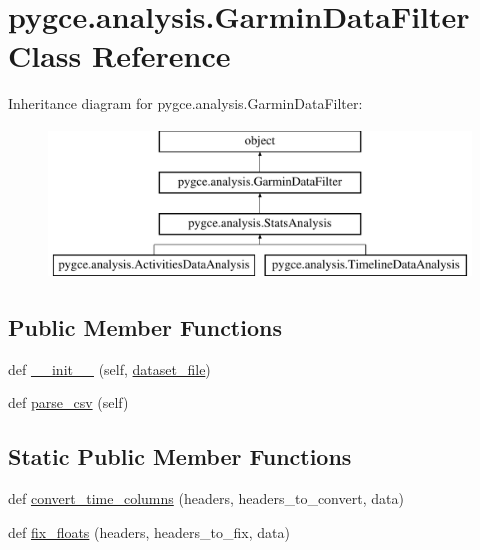 \hypertarget{classpygce_1_1analysis_1_1_garmin_data_filter}{}\section{pygce.\+analysis.\+Garmin\+Data\+Filter Class Reference}
\label{classpygce_1_1analysis_1_1_garmin_data_filter}
Inheritance diagram for pygce.\+analysis.\+Garmin\+Data\+Filter\+:\begin{figure}[H]
\begin{center}
\leavevmode
\includegraphics[height=4.000000cm]{classpygce_1_1analysis_1_1_garmin_data_filter}
\end{center}
\end{figure}
\subsection*{Public Member Functions}
\begin{DoxyCompactItemize}
\item 
def \hyperlink{classpygce_1_1analysis_1_1_garmin_data_filter_af82a21b2ce628ac96f3e5c0586bc096c}{\+\_\+\+\_\+init\+\_\+\+\_\+} (self, \hyperlink{classpygce_1_1analysis_1_1_garmin_data_filter_a1d609bdd447d36bafce41e43586540ef}{dataset\+\_\+file})
\item 
def \hyperlink{classpygce_1_1analysis_1_1_garmin_data_filter_a20693ff1b6595241436b350403aeb63c}{parse\+\_\+csv} (self)
\end{DoxyCompactItemize}
\subsection*{Static Public Member Functions}
\begin{DoxyCompactItemize}
\item 
def \hyperlink{classpygce_1_1analysis_1_1_garmin_data_filter_adc6e58e018ad152b58e1c47a470412ff}{convert\+\_\+time\+\_\+columns} (headers, headers\+\_\+to\+\_\+convert, data)
\item 
def \hyperlink{classpygce_1_1analysis_1_1_garmin_data_filter_a57cc86d4089d42fe1dc06adbd8481d00}{fix\+\_\+floats} (headers, headers\+\_\+to\+\_\+fix, data)
\end{DoxyCompactItemize}
